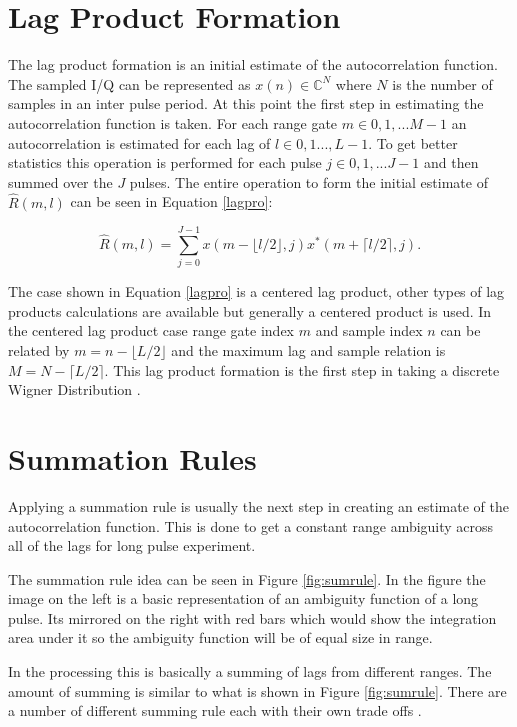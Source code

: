 \documentclass[10pt]{report}
\begin{document}
\section{Lag Product Formation}
The lag product formation is an initial estimate of the autocorrelation function.  The sampled I/Q can be represented as $x(n) \in\mathbb{C}^N$ where $N$ is the number of samples in an inter pulse period.  At this point the first step in estimating the autocorrelation function is taken.  For each range gate $m\in 0,1,...M-1$ an autocorrelation is estimated for each lag of $l \in 0,1...,L-1$.  To get better statistics this operation is performed for each pulse $j\in 0,1,...J-1$ and then summed over the $J$ pulses.  The entire operation to form the initial estimate of $\hat{R}(m,l)$ can be seen in Equation \ref{lagpro}:

\begin{equation}
\label{lagpro}
\hat{R}(m,l) = \displaystyle\sum\limits_{j=0}^{J-1} x(m-\lfloor l/2\rfloor,j)x^*(m+\lceil l/2 \rceil,j).
\end{equation}

The case shown in Equation \ref{lagpro} is a centered lag product, other types of lag products calculations are available but generally a centered product is used. In the centered lag product case range gate index $m$ and sample index $n$ can be related by $m=n-\lfloor L/2\rfloor$ and the maximum lag and sample relation is $M=N-\lceil L/2 \rceil$.  This lag product formation is the first step in taking a discrete Wigner Distribution \cite{TFAcohen}.

\section{Summation Rules}
Applying a summation rule is usually the next step in creating an estimate of the autocorrelation function.  This is done to get a constant range ambiguity across all of the lags for long pulse experiment\cite{nygren1996}. 

The summation rule idea can be seen in Figure \ref{fig:sumrule}.  In the figure the image on the left is a basic representation of an ambiguity function of a long pulse.  Its mirrored on the right with red bars which would show the integration area under it so the ambiguity function will be of equal size in range.  

In the processing this is basically a summing of lags from different ranges.  The amount of summing is similar to what is shown in Figure \ref{fig:sumrule}.  There are a number of different summing rule each with their own trade offs \cite{nygren1996}.  
\end{document}
